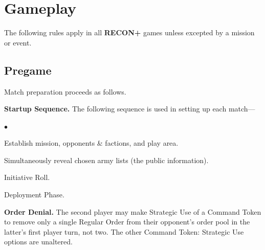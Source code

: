 \documentclass[14pt,dvipsnames]{extarticle}
\newcommand{\missionrule}[1]{\noindent\textbf{#1}\xspace}
\newenvironment{squishitemize}
{\begin{list}{$\bullet$}{%
    \setlength{\itemsep}{2pt}%
    \setlength{\parsep}{2pt}%
    \setlength{\topsep}{2pt}%
    \setlength{\parskip}{0pt} %
    \renewcommand{\labelitemi}{--}}}
  {\end{list}}
\newcommand{\reconplus}{\textbf{RECON+}\xspace}
\begin{document}
\section{Gameplay}

The following rules apply in all \reconplus games unless excepted by a
mission or event.

\subsection{Pregame}

Match preparation proceeds as follows.

\missionrule{Startup Sequence.}  The following sequence is used in
setting up each match---

\begin{squishitemize}
\item Establish mission, opponents \& factions, and play area.


\item Simultaneously reveal chosen army lists (the public information).

\item Initiative Roll.

\item Deployment Phase.
\end{squishitemize}

\missionrule{Order Denial.} The second player may make Strategic Use
of a Command Token to remove only a single Regular Order from their
opponent's order pool in the latter's first player turn, not two.  The
other Command Token: Strategic Use options are unaltered.


\end{document}
